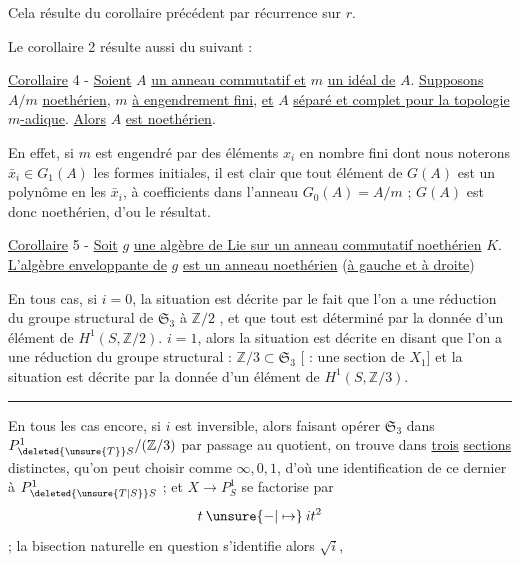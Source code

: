 Cela résulte du corollaire précédent par récurrence sur $r$.

Le corollaire 2 résulte aussi du suivant :

\uline{Corollaire} 4 - \uline{Soient} $A$ \uline{un anneau commutatif et} $m$ \uline{un idéal de} $A$. \uline{Supposons} $A/m$ \uline{noethérien}, $m$ \uline{à engendrement fini}, \uline{et} $A$ \uline{séparé et complet pour la topologie} $m$\uline{-adique}. \uline{Alors} $A$ \uline{est noethérien}.

En effet, si $m$ est engendré par des éléments $x_i$ en nombre fini dont nous noterons $\bar x_i\in G_1(A)$ les formes initiales, il est clair que tout élément de $G(A)$ est un polynôme en les $\bar x_i$, à coefficients dans l'anneau $G_0(A)=A/m$ ; $G(A)$ est donc noethérien, d'ou le résultat.

\uline{Corollaire} 5 - \uline{Soit} $g$ \uline{une algèbre de Lie sur un anneau commutatif noethérien} $K$. \uline{L'algèbre enveloppante de} $g$ \uline{est un anneau noethérien} (\uline{à gauche et à droite})


En tous cas, si $i=0$, la situation est décrite par le fait que l'on a  une réduction du groupe structural de $\mathfrak S_3$ à $\mathbb Z/2$ , et que tout est déterminé par la donnée d'un élément de $H^1(S,\mathbb Z/2)$.   $i=1$, alors la situation est décrite en disant que l'on a une réduction du groupe structural : $\mathbb Z/3\subset\mathfrak S_3$ [ : une section de  $X_1$] et la situation est décrite par la donnée d'un élément de $H^1(S,\mathbb Z/3)$.

\noindent\rule{.22\linewidth}{.4pt}

 En tous les cas encore, si $i$ est inversible, alors faisant opérer $\mathfrak S_3$ dans $P^1_{\deleted{\unsure{T}}S}/(\mathbb Z/3)$ par passage au quotient, on trouve dans    \uline{trois} \uline{sections} distinctes,  qu'on peut choisir comme $\infty,0,1$, d'où une identification de ce dernier à $P^1_{\deleted{\unsure{T|S}}S}$ ; et $X\longrightarrow P^1_S$ se factorise par
\[
t\mathbin{\unsure{-|\mapsto}}it^2
\]
; la bisection naturelle en question s'identifie alors  $\sqrt{i}$,

